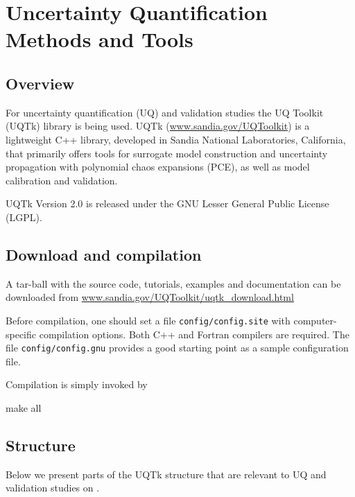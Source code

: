 
\chapter{Uncertainty Quantification Methods and Tools}
\label{chapter:uq}

\section{Overview}
\label{sec:uqoverview}
For uncertainty quantification (UQ) and validation studies the UQ Toolkit (UQTk) library is being used.
UQTk (\url{www.sandia.gov/UQToolkit}) is a lightweight C++ library, developed in Sandia National Laboratories, California, 
that primarily offers tools for surrogate model construction and uncertainty propagation with 
polynomial chaos expansions (PCE), as well as model calibration and validation.

UQTk Version 2.0 is released under the GNU Lesser General Public License (LGPL). 

\section{Download and compilation}
\label{sec:uqdownload}

A tar-ball with the source code, tutorials, examples and documentation can be 
downloaded from \url{www.sandia.gov/UQToolkit/uqtk\_download.html}

Before compilation, one should set a file \texttt{config/config.site} with computer-specific compilation options. 
Both C++ and Fortran compilers are required. The file \texttt{config/config.gnu} provides a good 
starting point as a sample configuration file.

Compilation is simply invoked by 
\begin{ShellCmd}
make all
\end{ShellCmd}


\section{Structure}
\label{sec:uqstruct}

Below we present parts of the UQTk structure that are relevant to UQ and validation studies on \sstmacro.

